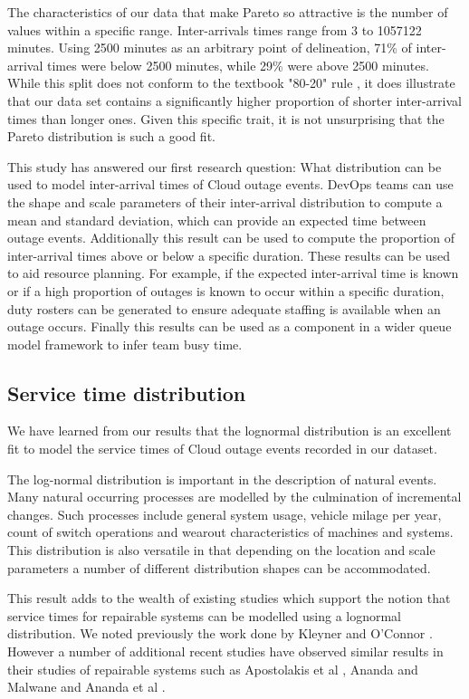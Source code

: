 \documentclass[5p]{elsarticle}
\begin{document}
The characteristics of our data that make Pareto so attractive is the number of values within a specific range. Inter-arrivals times range from 3 to 1057122 minutes. Using 2500 minutes as an arbitrary point of delineation, 71\% of inter-arrival times were below 2500 minutes, while 29\% were above 2500 minutes. While this split does not conform to the textbook "80-20" rule \cite{chen1993theoretical}, it does illustrate that our data set contains a significantly higher proportion of shorter inter-arrival times than longer ones. Given this specific trait, it is not unsurprising that the Pareto distribution is such a good fit. 

This study has answered our first research question: What distribution can be used to model inter-arrival times of Cloud outage events. DevOps teams can use the shape and scale parameters of their inter-arrival distribution to compute a mean and standard deviation, which can provide an expected time between outage events. Additionally this result can be used to compute the proportion of inter-arrival times above or below a specific duration. These results can be used to aid resource planning. For example, if the expected inter-arrival time is known or if a high proportion of outages is known to occur within a specific duration, duty rosters can be generated to ensure adequate staffing is available when an outage occurs. Finally this results can be used as a component in a wider queue model framework to infer team busy time.

\subsection{Service time distribution}

We have learned from our results that the lognormal distribution is an excellent fit to model the service times of Cloud outage events recorded in our dataset. 

The log-normal distribution is important in the description of natural events. Many natural occurring processes are modelled by the culmination of incremental changes. Such processes include general system usage, vehicle milage per year, count of switch operations and wearout characteristics of machines and systems. This distribution is also versatile in that depending on the location and scale parameters a number of different distribution shapes can be accommodated. 

This result adds to the wealth of existing studies which support the notion that service times for repairable systems can be modelled using a lognormal distribution. We noted previously the work done by Kleyner and O'Connor \cite{o2011practical}. However a number of additional recent studies have observed similar results in their studies of repairable systems such as Apostolakis et al  \cite{apostolakis1980synthesis}, Ananda and Malwane \cite{ananda2003confidence} and Ananda et al \cite{ananda2004steady}. 
\end{document}
